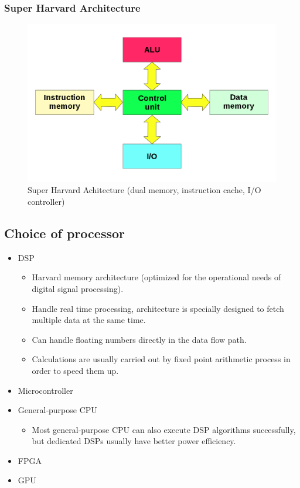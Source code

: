 \subsubsection{Super Harvard Architecture}
\begin{figure} [H]
	\centering
	\includegraphics[width=0.85\linewidth]{graphics/5.png}
	\caption{Super Harvard Achitecture (dual memory, instruction cache, I/O controller)}
	\label{fig:5}
\end{figure}

\subsection{Choice of processor}
\begin{itemize}
	\item DSP
	\begin{itemize}
		\item Harvard memory architecture (optimized for the operational needs of digital signal processing).
		\item Handle real time processing, architecture is specially designed to fetch multiple data at the same time.
		\item Can handle floating numbers directly in the data flow path.
		\item Calculations are usually carried out by fixed point arithmetic process in order to speed them up.
	\end{itemize}
	\item Microcontroller
	\item General‐purpose CPU
	\begin{itemize}
		\item Most general-purpose CPU can also execute DSP algorithms successfully, but dedicated DSPs usually have better power efficiency.
	\end{itemize}
	\item FPGA
	\item GPU
\end{itemize}

